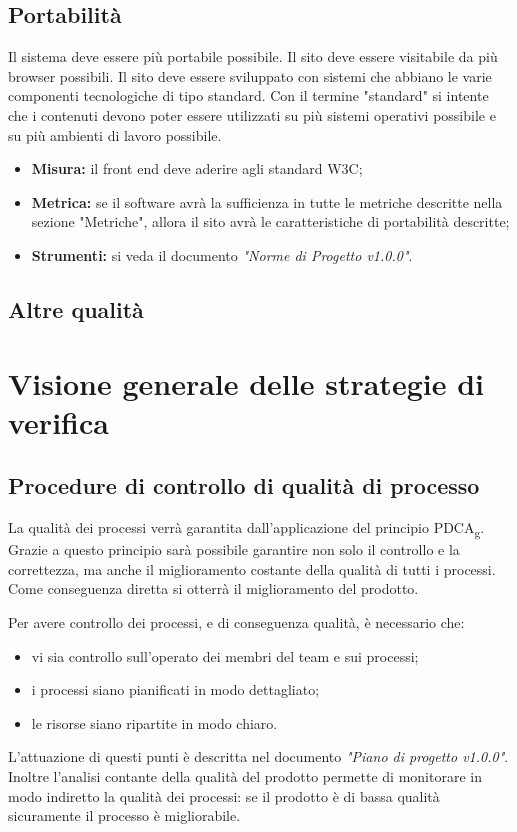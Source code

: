 \documentclass[12pt,a4paper,titlepage]{article}
\begin{document}
		\subsection{Portabilità}
		Il sistema deve essere più portabile possibile. Il sito deve essere visitabile da più browser possibili. Il sito deve essere sviluppato con sistemi che abbiano le varie componenti tecnologiche di tipo standard. Con il termine "standard" si intente che i contenuti devono poter essere utilizzati su più sistemi operativi possibile e su più ambienti di lavoro possibile.
			\begin{itemize}
				\item \textbf{Misura:} il front end deve aderire agli standard W3C;
				\item \textbf{Metrica:} se il software avrà la sufficienza in tutte le metriche descritte nella sezione "Metriche", allora il sito avrà le caratteristiche di portabilità descritte;
				\item \textbf{Strumenti:} si veda il documento \textit{"Norme di Progetto v1.0.0"}.
			\end{itemize}
		\subsection{Altre qualità}
	\section{Visione generale delle strategie di verifica}
	\subsection{Procedure di controllo di qualità di processo}
	La qualità dei processi verrà garantita dall'applicazione del principio PDCA\textsubscript{g}. Grazie a questo principio sarà possibile garantire non solo il controllo e la correttezza, ma anche il miglioramento costante della qualità di tutti i processi. Come conseguenza diretta si otterrà il miglioramento del prodotto.
	
	Per avere controllo dei processi, e di conseguenza qualità, è necessario che:
	\begin{itemize}
		\item vi sia controllo sull'operato dei membri del team e sui processi;
		\item i processi siano pianificati in modo dettagliato;
		\item le risorse siano ripartite in modo chiaro.
	\end{itemize}
	L'attuazione di questi punti è descritta nel documento \textit{"Piano di progetto v1.0.0"}. Inoltre l'analisi contante della qualità del prodotto permette di monitorare in modo indiretto la qualità dei processi: se il prodotto è di bassa qualità sicuramente il processo è migliorabile.
	
\end{document}
